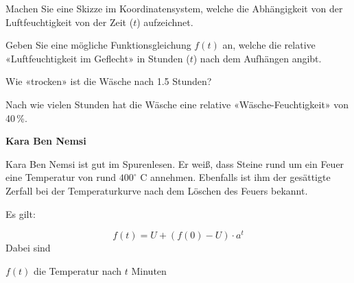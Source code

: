 \begin{bbwAufgabenBlock}
\item Machen Sie eine Skizze im Koordinatensystem, welche die
Abhängigkeit von der Luftfeuchtigkeit von der Zeit ($t$) aufzeichnet.


\item Geben Sie eine mögliche Funktionsgleichung $f(t)$ an, welche die relative
«Luftfeuchtigkeit im Geflecht» in Stunden ($t$) nach dem Aufhängen
angibt.


\item Wie «trocken» ist die Wäsche nach 1.5 Stunden?


\item Nach wie vielen Stunden hat die Wäsche eine relative
«Wäsche-Feuchtigkeit» von 40\,\%.


\TRAINER{

$$f(t) = 35 + 60 \cdot \left( \frac{19}{60}\right)^t$$
$f(t) = 40[\%]$ einsetzen:

$$40 [\%| = 35 + 60 \cdot \left( \frac{19}{60}\right)^t$$
$$5 [\%| = 60 \cdot \left( \frac{19}{60}\right)^t$$
$$\frac5{60} [\%| =\left( \frac{19}{60}\right)^t$$
$$t = \log_{\frac{19}{60}}(\frac5{60}) \approx 2.16 [\textrm{h}]$$
}%

\end{bbwAufgabenBlock}


\platzFuerBerechnungenBisEndeSeite{}



\bbwActAufgabenNr{} \textbf{Kara Ben Nemsi}
\nextBbwAufgabenNummer{}

Kara Ben Nemsi ist gut im Spurenlesen. Er weiß, dass Steine rund um ein Feuer eine Temperatur von rund $400^\circ$ C annehmen.
Ebenfalls ist ihm der gesättigte Zerfall bei der Temperaturkurve nach dem Löschen des Feuers bekannt.

Es gilt:

$$f(t) = U + \left(f(0) - U\right) \cdot{} a^t$$
Dabei sind

$f(t)$ die Temperatur nach $t$ Minuten

